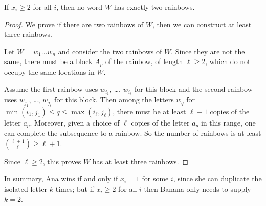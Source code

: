 \begin{claim*}
  If $x_i \ge 2$ for all $i$, then no word $W$ has exactly two rainbows.
\end{claim*}
\begin{proof}
  We prove if there are two rainbows of $W$, then we can construct
  at least three rainbows.

  Let $W = w_1 \dots w_n$ and consider the two rainbows of $W$.
  Since they are not the same, there must be a block $A_p$ of the rainbow,
  of length $\ell \ge 2$, which do not occupy the same locations in $W$.

  Assume the first rainbow uses $w_{i_1}$, \dots, $w_{i_\ell}$ for this block
  and the second rainbow uses $w_{j_1}$, \dots, $w_{j_\ell}$ for this block.
  Then among the letters $w_q$ for
  $\min(i_1, j_1) \le q \le \max(i_\ell, j_\ell)$,
  there must be at least $\ell+1$ copies of the letter $a_p$.
  Moreover, given a choice of $\ell$ copies of the letter $a_p$
  in this range, one can complete the subsequence to a rainbow.
  So the number of rainbows is at least $\binom{\ell+1}{\ell} \ge \ell+1$.

  Since $\ell \ge 2$, this proves $W$ has at least three rainbows.
\end{proof}

In summary, Ana wins if and only if $x_i = 1$ for some $i$,
since she can duplicate the isolated letter $k$ times;
but if $x_i \ge 2$ for all $i$ then Banana only needs to supply $k = 2$.
